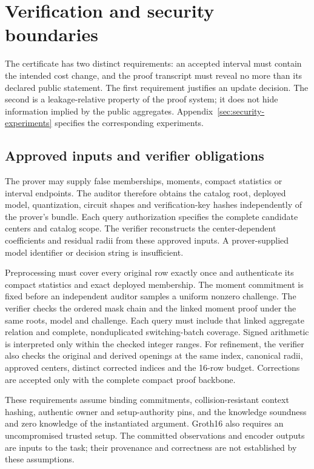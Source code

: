 \section{Verification and security boundaries}\label{sec:security}
The certificate has two distinct requirements: an accepted interval must
contain the intended cost change, and the proof transcript must reveal no
more than its declared public statement. The first requirement justifies an
update decision. The second is a leakage-relative property of the proof
system; it does not hide information implied by the public aggregates.
Appendix~\ref{sec:security-experiments} specifies the corresponding experiments.

\subsection{Approved inputs and verifier obligations}
The prover may supply false memberships, moments, compact statistics or
interval endpoints. The auditor therefore obtains the catalog root, deployed
model, quantization, circuit shapes and verification-key hashes independently
of the prover's bundle. Each query authorization specifies the complete
candidate centers and catalog scope. The verifier reconstructs the
center-dependent coefficients and residual radii from these approved inputs.
A prover-supplied model identifier or decision string is insufficient.

Preprocessing must cover every original row exactly once and authenticate
its compact statistics and exact deployed membership. The moment commitment
is fixed before an independent auditor samples a uniform nonzero challenge.
The verifier checks the ordered mask chain and the linked moment proof under
the same roots, model and challenge. Each query must include that linked
aggregate relation and complete, nonduplicated switching-batch coverage.
Signed arithmetic is interpreted only within the checked integer ranges.
For refinement, the verifier also checks the original and derived openings
at the same index, canonical radii, approved centers, distinct corrected
indices and the 16-row budget. Corrections are accepted only with the
complete compact proof backbone.

These requirements assume binding commitments, collision-resistant context
hashing, authentic owner and setup-authority pins, and the knowledge
soundness and zero knowledge of the instantiated argument. Groth16 also
requires an uncompromised trusted setup. The committed observations and
encoder outputs are inputs to the task; their provenance and correctness
are not established by these assumptions.

